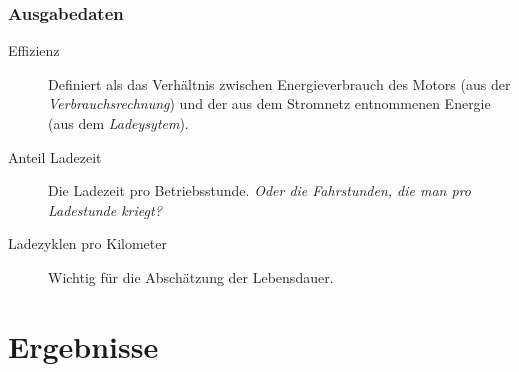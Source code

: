 \subsubsection{Ausgabedaten}
\begin{description}
	\item[Effizienz] Definiert als das Verhältnis zwischen Energieverbrauch des Motors (aus der \emph{Verbrauchsrechnung}) und der aus dem Stromnetz entnommenen Energie (aus dem \emph{Ladeysytem}).
	\item[Anteil Ladezeit] Die Ladezeit pro Betriebsstunde. \emph{Oder die Fahrstunden, die man pro Ladestunde kriegt?}
	\item[Ladezyklen pro Kilometer] Wichtig für die Abschätzung der Lebensdauer.
\end{description}

\section{Ergebnisse}